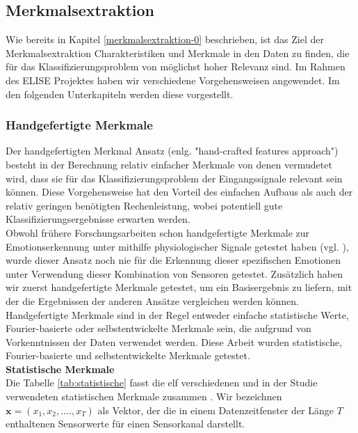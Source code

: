 \subsection{Merkmalsextraktion} \label{merkmalsextraftion-1}

Wie bereits in Kapitel \ref{merkmalsextraktion-0} beschrieben, ist das Ziel der Merkmalsextraktion Charakteristiken und Merkmale in den Daten zu finden, die f{\"u}r das
Klassifizierungsproblem von m{\"o}glichst hoher Relevanz sind. Im Rahmen des ELISE Projektes haben wir verschiedene Vorgehensweisen angewendet. Im den folgenden Unterkapiteln werden diese vorgestellt. \\


\subsubsection{Handgefertigte Merkmale} \label{hc-features-1}
Der handgefertigten Merkmal Ansatz (enlg. "hand-crafted features approach") besteht in der Berechnung relativ einfacher Merkmale von denen vermudetet wird, dass sie f{\"u}r das Klassifizierungsproblem der Eingangssignale relevant sein k{\"o}nnen. Diese Vorgehensweise hat den Vorteil des einfachen Aufbaus als auch der relativ geringen ben{\"o}tigten Rechenleistung, wobei potentiell gute Klassifizierungsergebnisse erwarten werden. \\


Obwohl fr{\"u}here Forschungsarbeiten schon handgefertigte Merkmale zur Emotionserkennung unter mithilfe physiologischer Signale getestet haben (vgl. \cite{martinez_ieee_2013}), wurde dieser Ansatz noch nie f{\"u}r die Erkennung dieser spezifischen Emotionen unter Verwendung dieser Kombination von Sensoren getestet.
Zus{\"a}tzlich haben wir zuerst handgefertigte Merkmale getestet, um ein Basisergebnis zu liefern, mit der die Ergebnissen der anderen Ans{\"a}tze vergleichen werden k{\"o}nnen.
Handgefertigte Merkmale sind in der Regel entweder einfache statistische Werte, Fourier-basierte oder selbstentwickelte Merkmale sein, die aufgrund von Vorkenntnissen der Daten verwendet werden. 
Diese Arbeit wurden statistische, Fourier-basierte und selbstentwickelte Merkmale getestet. \\

\textbf{Statistische Merkmale \\}
Die Tabelle \ref{tab:statistische} fasst die elf verschiedenen und in der Studie verwendeten statistischen Merkmale zusammen \cite{bscpiet}. Wir bezeichnen $\mathbf{x} = (x_1, x_2, ...., x_T) $ als Vektor, der die in einem Datenzeitfenster der L{\"a}nge $T$ enthaltenen Sensorwerte f{\"u}r einen Sensorkanal darstellt. 


